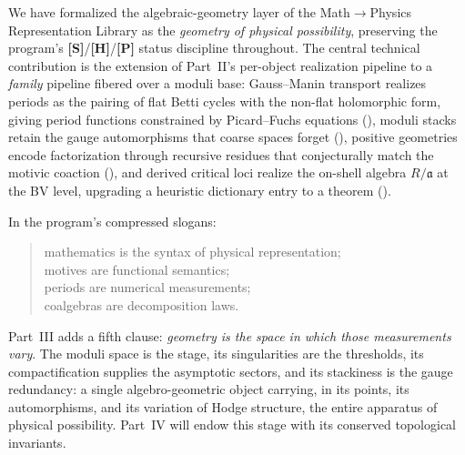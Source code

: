 \documentclass[12pt]{article}
\theoremstyle{definition}
\theoremstyle{remark}
\newcommand{\Ideal}{\mathfrak{a}}
\newcommand{\status}[1]{\textnormal{\textsf{\textbf{[#1]}}}}
\begin{document}
We have formalized the algebraic-geometry layer of the Math$\to$Physics Representation Library as the
\emph{geometry of physical possibility}, preserving the program's \status{S}/\status{H}/\status{P}
status discipline throughout. The central technical contribution is the extension of Part~II's
per-object realization pipeline to a \emph{family} pipeline fibered over a moduli base: Gauss--Manin
transport realizes periods as the pairing of flat Betti cycles with the non-flat holomorphic form, giving
period functions constrained by Picard--Fuchs equations (), moduli stacks retain the gauge
automorphisms that coarse spaces forget (), positive
geometries encode factorization through recursive residues that conjecturally match the motivic coaction
(), and derived critical loci realize the on-shell algebra $R/\Ideal$ at the BV level,
upgrading a heuristic dictionary entry to a theorem ().

In the program's compressed slogans:
\begin{quote}
mathematics is the syntax of physical representation;\\
motives are functional semantics;\\
periods are numerical measurements;\\
coalgebras are decomposition laws.
\end{quote}
Part~III adds a fifth clause: \emph{geometry is the space in which those measurements vary}. The moduli
space is the stage, its singularities are the thresholds, its compactification supplies the asymptotic
sectors, and its stackiness is the gauge redundancy: a single algebro-geometric object carrying, in
its points, its automorphisms, and its variation of Hodge structure, the entire apparatus of physical
possibility. Part~IV will endow this stage with its conserved topological invariants.
\end{document}
